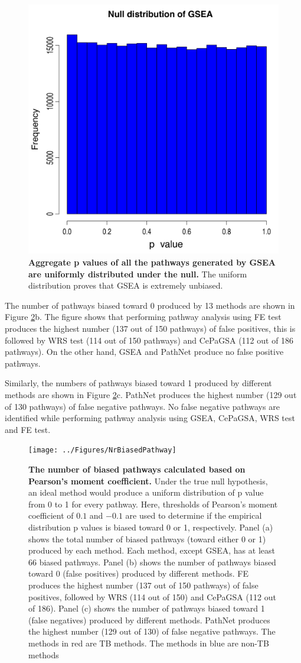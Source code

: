 \documentclass[Minh_PhD_thesis.tex]{subfiles}
\begin{document}
\begin{figure}
\centering
  \captionsetup{width=.8\linewidth}

	\includegraphics[width=0.5\linewidth]{../Figures/GSEAaggregate}
	\caption{\textbf{Aggregate p values of all the pathways generated by GSEA are uniformly distributed under the null.} The uniform distribution proves that GSEA is extremely unbiased.}\label{fig:GSEAagg}
\end{figure}


The number of pathways biased toward 0 produced by 13 methods are shown in Figure \ref{fig:NumberOfBias}b.
The figure shows that performing pathway analysis using FE test produces the highest number (137 out of 150 pathways) of false positives, this is followed by WRS test (114 out of 150 pathways) and CePaGSA (112 out of 186 pathways). On the other hand, GSEA and PathNet produce no false positive pathways.

Similarly, the numbers of pathways biased toward 1 produced by different methods are shown in Figure \ref{fig:NumberOfBias}c.
PathNet produces the highest number (129 out of 130 pathways) of false negative pathways.
No false negative pathways are identified while performing pathway analysis using GSEA, CePaGSA, WRS test and FE test.

\begin{figure}
\center
	\texttt{[image: ../Figures/NrBiasedPathway]}
        \caption{\textbf{The number of biased pathways calculated based on Pearson's moment coefficient.}  Under the true null hypothesis, an ideal method would produce a uniform distribution of p value from 0 to 1 for every pathway. Here, thresholds of Pearson's moment coefficient of $0.1$ and $-0.1$ are used to determine if the empirical distribution p values is biased toward 0 or 1, respectively.
        Panel (a) shows the total number of biased  pathways (toward either 0 or 1) produced by each method.
Each method, except GSEA, has at least 66 biased pathways.
Panel (b) shows the number of pathways biased toward 0 (false positives) produced by different methods.
FE  produces the highest number (137 out of 150 pathways) of false positives, followed by WRS  (114 out of 150) and CePaGSA (112 out of 186).
Panel (c) shows the number of pathways biased toward 1 (false negatives) produced by different methods.
PathNet produces the highest number (129 out of 130) of false negative pathways. The methods in red are TB methods. The methods in blue are non-TB methods}\label{fig:NumberOfBias}
\end{figure}
\end{document}
